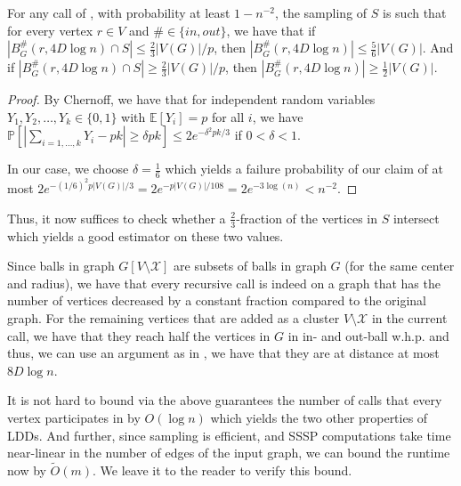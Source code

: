 \begin{claim}
For any call of , with probability at least $1- n^{-2}$, the sampling of $S$ is such that for every vertex $r \in V$ and $\# \in \{in, out\}$, we have that if $|B^{\#}_G(r, 4D \log n) \cap S| \leq \frac{2}{3}|V(G)|/p$, then $|B^{\#}_G(r, 4D \log n)| \leq \frac{5}{6} |V(G)|$. And if $|B^{\#}_G(r, 4D \log n) \cap S| \geq \frac{2}{3}|V(G)|/p$, then $|B^{\#}_G(r, 4D \log n)| \geq \frac{1}{2} |V(G)|$.
\end{claim}
\begin{proof}
By Chernoff, we have that for independent random variables $Y_1, Y_2, \ldots, Y_k \in \{0,1\}$ with $\mathbb{E}[Y_i] = p$ for all $i$, we have $\mathbb{P}[|\sum_{i = 1, \ldots, k} Y_i - pk| \geq \delta p k] \leq 2e^{-\delta^2 pk / 3}$ if $0 < \delta < 1$.

In our case, we choose $\delta = \frac{1}{6}$ which yields a failure probability of our claim of at most $2e^{-(1/6)^2 p|V(G)| / 3} = 2e^{- p|V(G)| / 108} = 2e^{- 3\log(n)} < n^{-2}$.
\end{proof}

Thus, it now suffices to  check whether a $\frac{2}{3}$-fraction of the vertices in $S$ intersect which yields a good estimator on these two values.

Since balls in graph $G[V \setminus \mathcal{X}]$ are subsets of balls in graph $G$ (for the same center and radius), we have that every recursive call is indeed on a graph that has the number of vertices decreased by a constant fraction compared to the original graph. For the remaining vertices that are added as a cluster $V \setminus \mathcal{X}$ in the current call, we have that they reach half the vertices in $G$ in in- and out-ball w.h.p. and thus, we can use an argument as in , we have that they are at distance at most $8 D \log n$. 

It is not hard to bound via the above guarantees the number of calls that every vertex participates in by $O(\log n)$ which yields the two other properties of LDDs. And further, since sampling is efficient, and SSSP computations take time near-linear in the number of edges of the input graph, we can bound the runtime now by $\tilde{O}(m)$. We leave it to the reader to verify this bound.